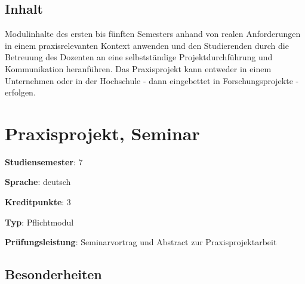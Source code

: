 \hypertarget{inhaltpathlabel....srcmodulbeschreibungen-bachelor-bpo5BA_Praxisprojekt}{%
\section*{Inhalt\label{../../src/modulbeschreibungen-bachelor-bpo5/BA_Praxisprojekt}}\label{inhaltpathlabel....srcmodulbeschreibungen-bachelor-bpo5BA_Praxisprojekt}}

Modulinhalte des ersten bis fünften Semesters anhand von realen
Anforderungen in einem praxisrelevanten Kontext anwenden und den
Studierenden durch die Betreuung des Dozenten an eine selbstständige
Projektdurchführung und Kommunikation heranführen. Das Praxisprojekt
kann entweder in einem Unternehmen oder in der Hochschule - dann
eingebettet in Forschungsprojekte - erfolgen.

\hypertarget{praxisprojekt-seminarpathlabel....srcmodulbeschreibungen-bachelor-bpo5ba_praxisprojektseminar}{%
\chapter{Praxisprojekt,
Seminar\label{../../src/modulbeschreibungen-bachelor-bpo5/BA_Praxisprojektseminar}}\label{praxisprojekt-seminarpathlabel....srcmodulbeschreibungen-bachelor-bpo5ba_praxisprojektseminar}}

\begin{modulHead}
\textbf{Studiensemester}:
7
\end{modulHead}
\begin{modulHead}
\textbf{Sprache}:
deutsch
\end{modulHead}
\begin{modulHead}
\textbf{Kreditpunkte}:
3
\end{modulHead}
\begin{modulHead}
\textbf{Typ}:
Pflichtmodul
\end{modulHead}
\begin{modulHead}
\textbf{Prüfungsleistung}:
Seminarvortrag und Abstract zur Praxisprojektarbeit
\end{modulHead}


\hypertarget{besonderheitenpathlabel....srcmodulbeschreibungen-bachelor-bpo5ba_praxisprojektseminar}{%
\section*{Besonderheiten\label{../../src/modulbeschreibungen-bachelor-bpo5/BA_Praxisprojektseminar}}\label{besonderheitenpathlabel....srcmodulbeschreibungen-bachelor-bpo5ba_praxisprojektseminar}}

